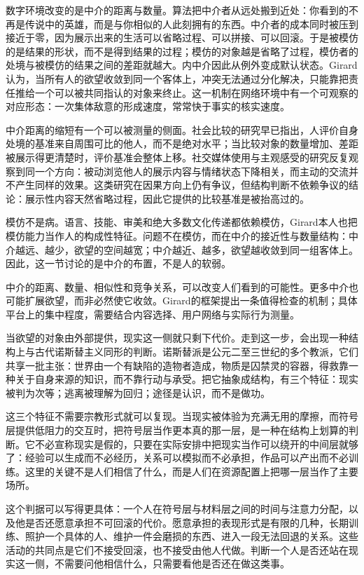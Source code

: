 数字环境改变的是中介的距离与数量。算法把中介者从远处搬到近处：你看到的不再是传说中的英雄，而是与你相似的人此刻拥有的东西。中介者的成本同时被压到接近于零，因为展示出来的生活可以省略过程、可以拼接、可以回滚。于是被模仿的是结果的形状，而不是得到结果的过程；模仿的对象越是省略了过程，模仿者的处境与被模仿的结果之间的差距就越大。内中介因此从例外变成默认状态。Girard认为，当所有人的欲望收敛到同一个客体上，冲突无法通过分化解决，只能靠把责任推给一个可以被共同指认的对象来终止\cite{girard1972violence}。这一机制在网络环境中有一个可观察的对应形态：一次集体敌意的形成速度，常常快于事实的核实速度。

中介距离的缩短有一个可以被测量的侧面。社会比较的研究早已指出，人评价自身处境的基准来自周围可比的他人，而不是绝对水平；当比较对象的数量增加、差距被展示得更清楚时，评价基准会整体上移。社交媒体使用与主观感受的研究反复观察到同一个方向：被动浏览他人的展示内容与情绪状态下降相关，而主动的交流并不产生同样的效果。这类研究在因果方向上仍有争议，但结构判断不依赖争议的结论：展示性内容天然省略过程，因此它提供的比较基准是被抬高过的。\cite{festinger1954theory}\cite{verduyn2015passive}

模仿不是病。语言、技能、审美和绝大多数文化传递都依赖模仿，Girard本人也把模仿能力当作人的构成性特征。问题不在模仿，而在中介的接近性与数量结构：中介越远、越少，欲望的空间越宽；中介越近、越多，欲望越收敛到同一组客体上。因此，这一节讨论的是中介的布置，不是人的软弱。

中介的距离、数量、相似性和竞争关系，可以改变人们看到的可能性。更多中介也可能扩展欲望，而非必然使它收敛。Girard的框架提出一条值得检查的机制；具体平台上的集中程度，需要结合内容选择、用户网络与实际行为测量。


当欲望的对象由外部提供，现实这一侧就只剩下代价。走到这一步，会出现一种结构上与古代诺斯替主义同形的判断。诺斯替派是公元二至三世纪的多个教派，它们共享一批主张：世界由一个有缺陷的造物者造成，物质是囚禁灵的容器，得救靠一种关于自身来源的知识，而不靠行动与承受。把它抽象成结构，有三个特征：现实被判为次等；逃离被理解为回归；途径是认识，而不是做功。

这三个特征不需要宗教形式就可以复现。当现实被体验为充满无用的摩擦，而符号层提供低阻力的交互时，把符号层当作更本真的那一层，是一种在结构上划算的判断。它不必宣称现实是假的，只要在实际安排中把现实当作可以绕开的中间层就够了：经验可以生成而不必经历，关系可以模拟而不必承担，作品可以产出而不必训练。这里的关键不是人们相信了什么，而是人们在资源配置上把哪一层当作了主要场所。

这个判据可以写得更具体：一个人在符号层与材料层之间的时间与注意力分配，以及他是否还愿意承担不可回滚的代价。愿意承担的表现形式是有限的几种，长期训练、照护一个具体的人、维护一件会磨损的东西、进入一段无法回退的关系。这些活动的共同点是它们不接受回滚，也不接受由他人代做。判断一个人是否还站在现实这一侧，不需要问他相信什么，只需要看他是否还在做这类事。

